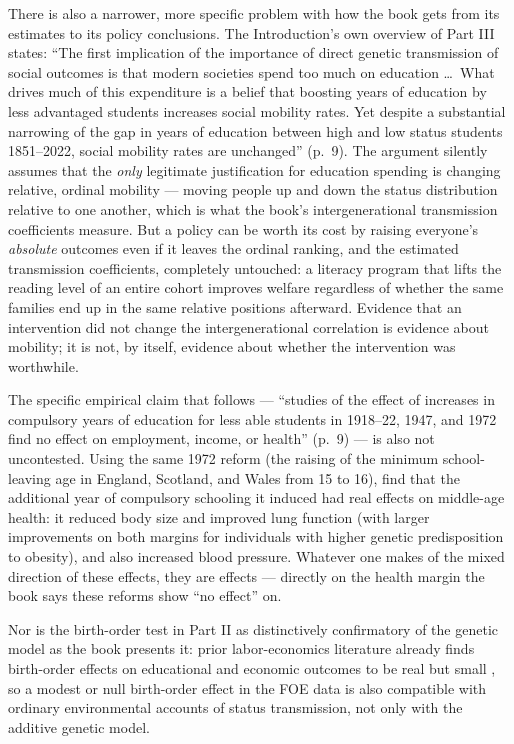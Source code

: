 \documentclass[12pt]{article}
\begin{document}
There is also a narrower, more specific problem with how the book gets from
its estimates to its policy conclusions. The Introduction's own overview of Part III states:
``The first
implication of the importance of direct genetic transmission of social
outcomes is that modern societies spend too much on education \ldots\ What
drives much of this expenditure is a belief that boosting years of education
by less advantaged students increases social mobility rates. Yet despite a
substantial narrowing of the gap in years of education between high and low
status students 1851--2022, social mobility rates are unchanged'' (p.~9). The
argument silently assumes that the \emph{only} legitimate justification for
education spending is changing relative, ordinal mobility --- moving people
up and down the status distribution relative to one another, which is what
the book's intergenerational transmission coefficients measure. But a policy
can be worth its cost by raising everyone's \emph{absolute} outcomes even if
it leaves the ordinal ranking, and the estimated transmission coefficients,
completely untouched: a literacy program that lifts the reading level of an
entire cohort improves welfare regardless of whether the same families end up
in the same relative positions afterward. Evidence that an intervention did
not change the intergenerational correlation is evidence about mobility; it
is not, by itself, evidence about whether the intervention was worthwhile.

The specific empirical claim that follows --- ``studies of the effect of
increases in compulsory years of education for less able students in
1918--22, 1947, and 1972 find no effect on employment, income, or health''
(p.~9) --- is also not uncontested. Using the same 1972 reform (the raising of
the minimum school-leaving age in England, Scotland, and Wales from 15 to
16), \citet{BarcellosEtAl2018} find that the additional year of compulsory
schooling it induced had real effects on middle-age health: it reduced body
size and improved lung function (with larger improvements on both margins
for individuals with higher genetic predisposition to obesity), and also
increased blood pressure. Whatever one makes of the mixed direction of these
effects, they are effects --- directly on the health margin the book says
these reforms show ``no effect'' on.

Nor is the birth-order test in Part II as distinctively confirmatory of the
genetic model as the book presents it: prior labor-economics literature
already finds birth-order effects on educational and economic outcomes to be
real but small \citep{BlackDevereuxSalvanes2005}, so a modest or null
birth-order effect in the FOE data is also compatible with ordinary
environmental accounts of status transmission, not only with the additive
genetic model.
\end{document}
